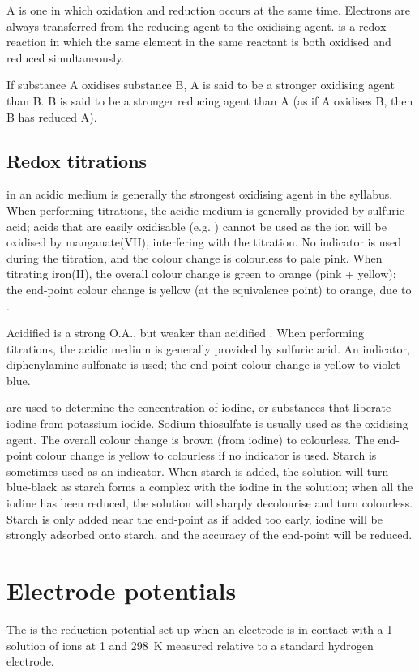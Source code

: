 \documentclass[Chemistry.tex]{subfiles}
\begin{document}
A  is one in which oxidation and reduction occurs at the same time. Electrons are always transferred from the reducing agent to the oxidising agent.
 is a redox reaction in which the same element in the same reactant is both oxidised and reduced simultaneously.

If substance A oxidises substance B, A is said to be a stronger oxidising agent than B. B is said to be a stronger reducing agent than A (as if A oxidises B, then B has reduced A).
\subsection{Redox titrations}
 in an acidic medium is generally the strongest oxidising agent in the syllabus. When performing  titrations, the acidic medium is generally provided by sulfuric acid; acids that are easily oxidisable (e.g. ) cannot be used as the ion will be oxidised by manganate(VII), interfering with the titration. No indicator is used during the titration, and the colour change is colourless to pale pink. When titrating iron(II), the overall colour change is green to orange (pink + yellow); the end-point colour change is yellow (at the equivalence point) to orange, due to .

Acidified  is a strong O.A., but weaker than acidified . When performing  titrations, the acidic medium is generally provided by sulfuric acid. An indicator, diphenylamine sulfonate is used; the end-point colour change is yellow to violet blue.

 are used to determine the concentration of iodine, or substances that liberate iodine from potassium iodide. Sodium thiosulfate is usually used as the oxidising agent. The overall colour change is brown (from iodine) to colourless. The end-point colour change is yellow to colourless if no indicator is used. Starch is sometimes used as an indicator. When starch is added, the solution will turn blue-black as starch forms a complex with the iodine in the solution; when all the iodine has been reduced, the solution will sharply decolourise and turn colourless. Starch is only added near the end-point as if added too early, iodine will be strongly adsorbed onto starch, and the accuracy of the end-point will be reduced.
\section{Electrode potentials}\label{sec:6-2.eo}
The  \slEo{} is the reduction potential set up when an electrode is in contact with a \SI{1}{\molar} solution of ions at \SI{1}{\atmosphere} and \SI{298}{\kelvin} measured relative to a standard hydrogen electrode.
\end{document}

